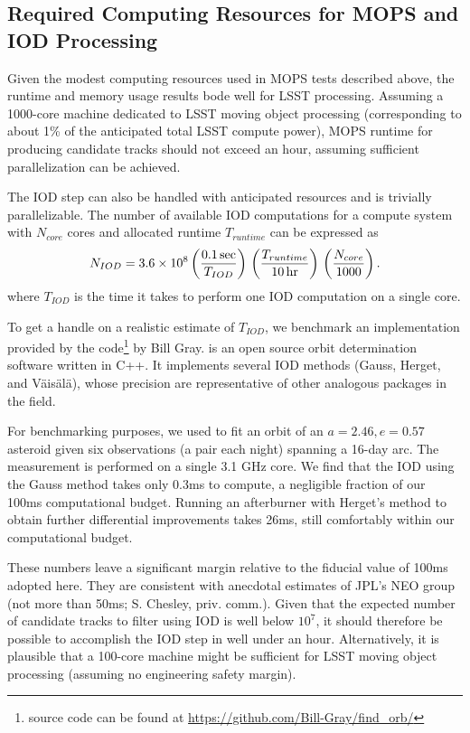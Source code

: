 \subsection{Required Computing Resources for MOPS and IOD Processing}

Given the modest computing resources used in MOPS tests described above, the runtime and memory
usage results bode well for LSST processing. Assuming a 1000-core machine dedicated to LSST moving
object processing (corresponding to about 1\% of the anticipated total LSST compute power), MOPS runtime for producing
candidate tracks should not exceed an hour, assuming sufficient parallelization can be achieved.

The IOD step can also be handled with anticipated resources and is trivially parallelizable. The number 
of available IOD computations for a compute system with $N_{core}$ cores and allocated runtime $T_{runtime}$ 
can be expressed as
\begin{equation}
  N_{IOD} = 3.6\times10^8 \left({ 0.1\,{\rm sec} \over T_{IOD}}\right) \,
                                         \left({ T_{runtime}  \over 10\,{\rm hr} }\right) \,
                                         \left({ N_{core}  \over 1000}\right).
\end{equation}
where $T_{IOD}$ is the time it takes to perform one IOD computation on a single core. 

To get a handle on a realistic estimate of $T_{IOD}$, we benchmark an implementation provided
by the \FindOrb code\footnote{\FindOrb source code can be found at \url{https://github.com/Bill-Gray/find_orb/}} by Bill Gray.
\FindOrb is an open source orbit determination software written in C++.
It implements several IOD methods (Gauss, Herget, and V\"{a}is\"{a}l\"{a}),
whose precision are representative of other analogous packages in the field.

For benchmarking purposes, we used \FindOrb to fit an orbit of an 
$a = 2.46, e = 0.57$ asteroid given six observations (a pair each night) 
spanning a 16-day arc. The measurement is performed on a single 3.1 GHz core. 
We find that the IOD using the Gauss method takes only 0.3ms to compute, a negligible fraction of 
our 100ms computational budget. Running an afterburner with Herget's method
to obtain further differential improvements takes 26ms, still comfortably 
within our computational budget.

These numbers leave a significant margin relative to the fiducial value of 100ms adopted here.
They are consistent with anecdotal estimates of JPL's NEO group (not more than 50ms; S. Chesley, priv. comm.). Given that the expected number of candidate tracks to filter using
IOD is well below $10^7$, it should therefore be possible to accomplish the IOD step in well under an hour.
Alternatively, it is plausible that a 100-core machine might be sufficient for LSST moving object
processing (assuming no engineering safety margin).

